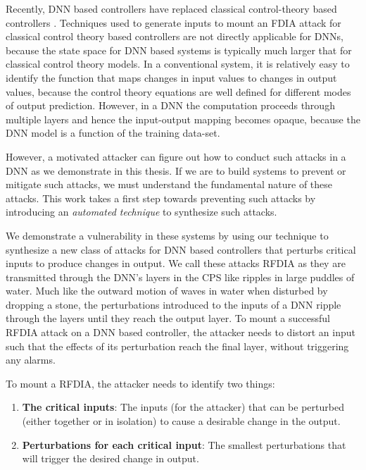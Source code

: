 Recently,  \ac{DNN} based controllers have replaced classical control-theory based controllers \cite{xiang18} \cite{Kocic2019} \cite{bechtel2017deeppicar}.  
Techniques used to generate inputs to mount an FDIA attack for classical control theory based controllers are not directly applicable for DNNs, because the state space for DNN based systems is typically much larger that for classical control theory models. 
In a conventional system, it is relatively easy to identify the function that maps changes in input values to changes in output values, because the control theory equations are well defined for different modes of output prediction.
However, in a \ac{DNN} the computation proceeds through multiple layers and hence the input-output mapping becomes opaque, because the \ac{DNN} model is a function of the training data-set.

However, a motivated attacker can figure out how to conduct such attacks in a \ac{DNN} as we demonstrate in this thesis. 
If we are to build systems to prevent or mitigate such attacks, we must understand the fundamental nature of these attacks. 
This work takes a first step towards preventing such attacks by introducing an {\em automated technique} to synthesize such attacks. 

We demonstrate a vulnerability in these systems  by using our technique to synthesize a new class of attacks for DNN based controllers that perturbs critical inputs to produce changes in output. 
We call these attacks \ac{RFDIA} as they are transmitted through the DNN's layers in the CPS like ripples in large puddles of water. 
Much like the outward motion of waves in water when disturbed by dropping a stone, the perturbations introduced to the inputs of a DNN ripple through the layers until they reach the output layer. 
To mount a successful \ac{RFDIA} attack on a DNN based controller, the attacker needs to distort an input such  that the effects of its perturbation reach the final layer, without triggering any alarms. 

To mount a \ac{RFDIA}, the attacker needs to identify two things: 
\begin{enumerate}
	\item \textbf{The critical inputs}: The inputs (for the attacker) that can be perturbed (either together or in isolation) to cause a desirable change in the output.
	\item \textbf{Perturbations for each critical input}: The smallest perturbations that will trigger the desired change in output. 
\end{enumerate}


